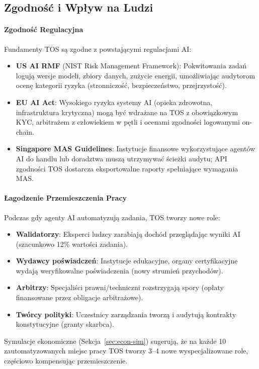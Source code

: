 \documentclass[11pt]{article}
\begin{document}
\subsection{Zgodność i Wpływ na Ludzi}
\paragraph{Zgodność Regulacyjna} Fundamenty TOS są zgodne z powstającymi regulacjami AI:
\begin{itemize}[noitemsep]
  \item \textbf{US AI RMF} (NIST Risk Management Framework): Pokwitowania zadań logują wersje modeli, zbiory danych, zużycie energii, umożliwiając audytorom ocenę kategorii ryzyka (stronniczość, bezpieczeństwo, przejrzystość).
  \item \textbf{EU AI Act}: Wysokiego ryzyka systemy AI (opieka zdrowotna, infrastruktura krytyczna) mogą być wdrażane na TOS z obowiązkowym KYC, arbitrażem z człowiekiem w pętli i ocenami zgodności logowanymi on-chain.
  \item \textbf{Singapore MAS Guidelines}: Instytucje finansowe wykorzystujące agentów AI do handlu lub doradztwa muszą utrzymywać ścieżki audytu; API zgodności TOS dostarcza eksportowalne raporty spełniające wymagania MAS.
\end{itemize}

\paragraph{Łagodzenie Przemieszczenia Pracy} Podczas gdy agenty AI automatyzują zadania, TOS tworzy nowe role:
\begin{itemize}[noitemsep]
  \item \textbf{Walidatorzy}: Eksperci ludzcy zarabiają dochód przeglądając wyniki AI (szacunkowo 12\% wartości zadania).
  \item \textbf{Wydawcy poświadczeń}: Instytucje edukacyjne, organy certyfikacyjne wydają weryfikowalne poświadczenia (nowy strumień przychodów).
  \item \textbf{Arbitrzy}: Specjaliści prawni/techniczni rozstrzygają spory (opłaty finansowane przez obligacje arbitrażowe).
  \item \textbf{Twórcy polityki}: Uczestnicy zarządzania tworzą i audytują kontrakty konstytucyjne (granty skarbca).
\end{itemize}
Symulacje ekonomiczne (Sekcja~\ref{sec:econ-sim}) sugerują, że na każde 10 zautomatyzowanych miejsc pracy TOS tworzy 3--4 nowe wyspecjalizowane role, częściowo kompensując przemieszczenie.
\end{document}
